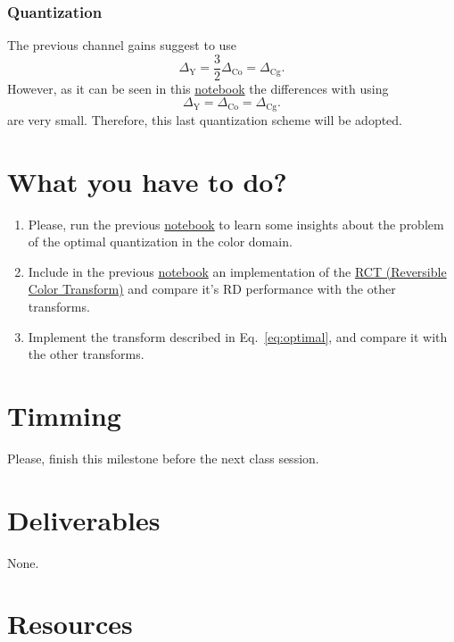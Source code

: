 \subsubsection{Quantization}
The previous channel gains suggest to use
\begin{equation}
  \Delta_{\text{Y}} = \frac{3}{2}\Delta_{\text{Co}} = \Delta_{\text{Cg}}.
\end{equation}
However, as it can be seen in this \href{https://github.com/Sistemas-Multimedia/Sistemas-Multimedia.github.io/blob/master/study_guide/06-color_transform/performance.ipynb}{notebook} the differences with using
\begin{equation}
  \Delta_{\text{Y}} = \Delta_{\text{Co}} = \Delta_{\text{Cg}}.
\end{equation}
are very small. Therefore, this last quantization scheme will be adopted.

\section{What you have to do?}

\begin{enumerate}
\item Please, run the previous
  \href{https://github.com/Sistemas-Multimedia/Sistemas-Multimedia.github.io/blob/master/study_guide/06-color_transform/performance.ipynb}{notebook}
  to learn some insights about the problem of the optimal
  quantization in the color domain.
\item Include in the previous
  \href{https://github.com/Sistemas-Multimedia/Sistemas-Multimedia.github.io/blob/master/study_guide/06-color_transform/performance.ipynb}{notebook}
  an implementation of the
  \href{https://en.wikipedia.org/wiki/JPEG_2000#Color_components_transformation}{RCT
    (Reversible Color Transform)} and compare it's RD performance with
  the other transforms.
\item Implement the transform described in Eq.~\ref{eq:optimal}, and
  compare it with the other transforms.
\end{enumerate}

\section{Timming}

Please, finish this milestone before the next class session.

\section{Deliverables}

None.

\section{Resources}

\renewcommand{\addcontentsline}[3]{}%

